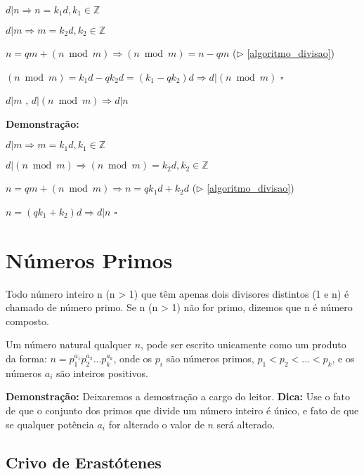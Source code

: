 $d|n \Rightarrow n = k_1d, k_1 \in \mathbb{Z}$

$d|m \Rightarrow m = k_2d, k_2 \in \mathbb{Z}$

$n = qm + (n \bmod m) \Rightarrow (n \bmod m) = n - qm$ ($\triangleright$ \autoref{algoritmo_divisao})

$(n \bmod m) = k_1d - qk_2d = (k_1 - qk_2)d \Rightarrow d|(n \bmod m)$ $\square$


\begin{corollary}\label{divisibilidade_modular2}
$d|m$ , $d|(n \bmod m) \Rightarrow d|n$
\end{corollary}
\textbf{Demonstração:}

$d|m \Rightarrow m = k_1d, k_1 \in \mathbb{Z}$

$d|(n \bmod m) \Rightarrow (n \bmod m) = k_2d, k_2 \in \mathbb{Z}$

$n = qm + (n \bmod m) \Rightarrow n = qk_1d + k_2d$ ($\triangleright$ \autoref{algoritmo_divisao})

$n = (qk_1 + k_2)d \Rightarrow d|n$ $\square$

\section{Números Primos}

\begin{definition} 
Todo número inteiro n (n > 1) que têm apenas dois divisores distintos (1 e n) é chamado de número primo. Se n (n > 1) não for primo, dizemos que n é número composto.
\end{definition}


\begin{theorem}\label{fatoracao_unica}
Um número natural qualquer $n$, pode ser escrito unicamente como um produto da forma: 
$n = p_1^{a_1}p_2^{a_2}...p_k^{a_k}$, onde os $p_i$ são números primos, $p_1 < p_2 < ... < p_k$, e os números $a_i$ são inteiros positivos.
\end{theorem}
\textbf{Demonstração:}
Deixaremos a demostração a cargo do leitor.
\textbf{Dica:} Use o fato de que o conjunto dos primos que divide um número inteiro é único, e fato de que se qualquer potência $a_i$ for alterado o valor de $n$ será alterado.

\subsection{Crivo de Erastótenes}

